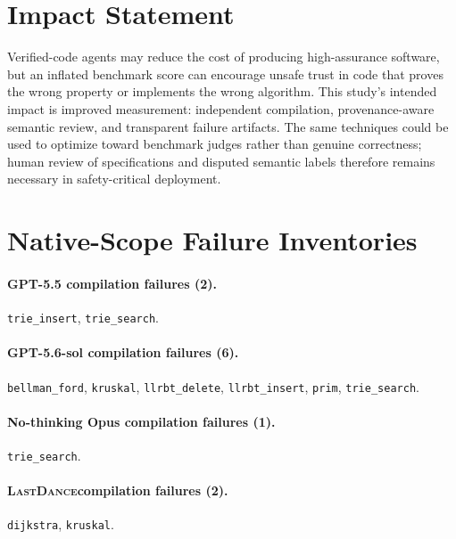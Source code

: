 \documentclass{article}
\newcommand{\task}[1]{\texttt{#1}}
\newcommand{\lastdance}{\textsc{LastDance}}
\begin{document}
\section*{Impact Statement}

Verified-code agents may reduce the cost of producing high-assurance software, but an
inflated benchmark score can encourage unsafe trust in code that proves the wrong
property or implements the wrong algorithm.  This study's intended impact is improved
measurement: independent compilation, provenance-aware semantic review, and transparent
failure artifacts.  The same techniques could be used to optimize toward benchmark
judges rather than genuine correctness; human review of specifications and disputed
semantic labels therefore remains necessary in safety-critical deployment.




\clearpage
\onecolumn

\appendix

\section{Native-Scope Failure Inventories}

\paragraph{GPT-5.5 compilation failures (2).}
\task{trie\_insert}, \task{trie\_search}.

\paragraph{GPT-5.6-sol compilation failures (6).}
\task{bellman\_ford}, \task{kruskal}, \task{llrbt\_delete}, \task{llrbt\_insert},
\task{prim}, \task{trie\_search}.

\paragraph{No-thinking Opus compilation failures (1).}
\task{trie\_search}.

\paragraph{\lastdance compilation failures (2).}
\task{dijkstra}, \task{kruskal}.
\end{document}
